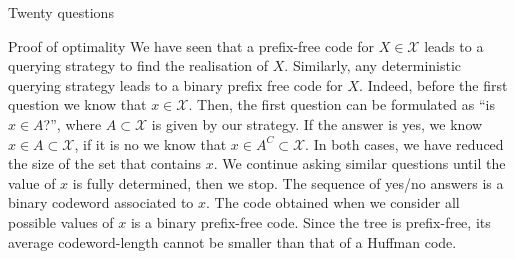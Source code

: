 \documentclass[a4paper]{article}
\begin{document}
\begin{parag}{Twenty questions}
    \begin{subparag}{Proof of optimality}
        We have seen that a prefix-free code for $X \in \mathcal{X}$ leads to a querying strategy to find the realisation of $X$. Similarly, any deterministic querying strategy leads to a binary prefix free code for $X$. Indeed, before the first question we know that $x \in \mathcal{X}$. Then, the first question can be formulated as ``is $x \in A$?'', where $A \subset \mathcal{X}$ is given by our strategy. If the answer is yes, we know $x \in A \subset \mathcal{X}$, if it is no we know that $x \in A^C \subset \mathcal{X}$. In both cases, we have reduced the size of the set that contains $x$. We continue asking similar questions until the value of $x$ is fully determined, then we stop. The sequence of yes/no answers is a binary codeword associated to $x$. The code obtained when we consider all possible values of $x$ is a binary prefix-free code. Since the tree is prefix-free, its average codeword-length cannot be smaller than that of a Huffman code.
    \end{subparag}
\end{parag}
\end{document}
